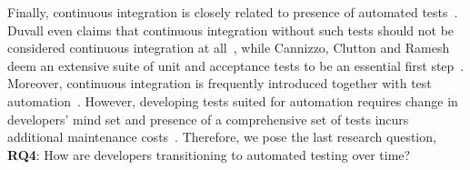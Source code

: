 Finally, continuous integration is closely related to presence of automated tests~\cite{Fowler}. 
Duvall even claims that continuous integration without such tests should not be considered continuous integration 
at all~\cite{Duvall}, while Cannizzo, Clutton and Ramesh deem an extensive suite of unit and acceptance tests to 
be an essential first step~\cite{CannizzoCluttonRamesh}. 
Moreover, continuous integration is frequently introduced together with test automation~\cite{Yuksel}.
However, developing tests suited for automation requires change in developers' mind set and presence of a  comprehensive set of tests incurs additional maintenance costs~\cite{CoramBohner}.
Therefore, we pose the last research question,  \textbf{RQ4}: How are developers transitioning to automated testing over time? 

